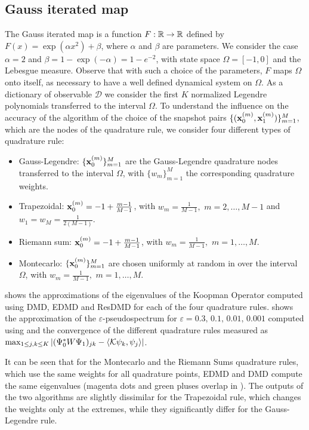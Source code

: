 \subsection{Gauss iterated map}
The Gauss iterated map is a function $F:\mathbb{R}\to\mathbb{R}$ defined by $F(x) =\exp(\alpha x^2) + \beta $, where $\alpha$ and $\beta$ are parameters. We consider the case $\alpha = 2$ and $\beta = 1-\exp(-\alpha) = 1 - e^{-2}$, with state space $\Omega = [-1, 0]$ and the Lebesgue measure. Observe that with such a choice of the parameters, $F$ maps $\Omega$ onto itself, as necessary to have a well defined dynamical system on $\Omega$. As a dictionary of observable $\mathcal{D}$ we consider the first $K$ normalized Legendre polynomials transferred to the interval $\Omega$. To understand the influence on the accuracy of the algorithm of the choice of the snapshot pairs $\{(\vb{x}_0^{(m)}, \vb{x}_1^{(m)})\}_{m = 1}^M$, which are the nodes of the quadrature rule, we consider four different types of quadrature rule:
\begin{itemize}
    \item Gauss-Legendre: $\{\vb{x}_0^{(m)}\}_{m = 1}^M$ are the Gauss-Legendre quadrature nodes transferred to the interval $\Omega$, with $\{w_m\}_{m = 1}^M$ the corresponding quadrature weights.
    \item Trapezoidal: $\vb{x}_0^{(m)} = -1 + \frac{m-1}{M-1}$, with $w_m = \frac{1}{M-1},\,\,m = 2,\dots, M-1$ and $w_1 = w_M = \frac{1}{2(M-1)}$.
    \item Riemann sum: $\vb{x}_0^{(m)} = -1 + \frac{m-1}{M-1}$, with $w_m = \frac{1}{M-1},\,\,m = 1,\dots, M$.
    \item Montecarlo: $\{\vb{x}_0^{(m)}\}_{m = 1}^M$ are chosen uniformly at random in over the interval $\Omega$, with $w_m = \frac{1}{M-1},\,\,m = 1,\dots, M$. 
\end{itemize}

 shows the approximations of the eigenvalues of the Koopman Operator computed using DMD, EDMD and ResDMD for each of the four quadrature rules.  shows the approximation of the $\varepsilon$-pseudospectrum for $\varepsilon = 0.3,\,0.1,\,0.01,\,0.001$ computed using  and the convergence of the different quadrature rules measured as $\max_{1\leq j,k \leq K} \abs{(\Psi_0^* W \Psi_1)_{jk} - \langle\mathcal{K}\psi_k, \psi_j\rangle}$.

It can be seen that for the Montecarlo and the Riemann Sums quadrature rules, which use the same weights for all quadrature points, EDMD and DMD compute the same eigenvalues (magenta dots and green pluses overlap in ). The outputs of the two algorithms are slightly dissimilar for the Trapezoidal rule, which changes the weights only at the extremes, while they significantly differ for the Gauss-Legendre rule.

